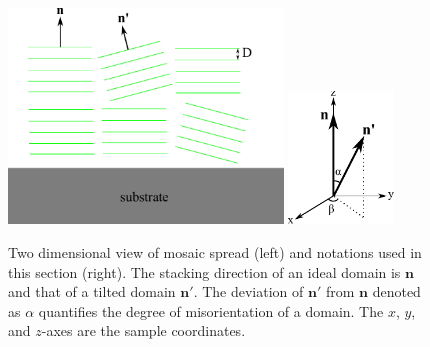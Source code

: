 \begin{figure}
  \centering
  \includegraphics[width=0.65\textwidth]{figures/ripple/mosaic/stack}
  \quad
  \includegraphics[width=0.25\textwidth]{figures/ripple/mosaic/spherical_coordinates}
  \caption{Two dimensional view of mosaic spread (left) and 
  notations used in this section (right). 
  The stacking direction of an ideal
  domain is $\mathbf{n}$ and that of a tilted domain $\mathbf{n'}$. 
  The deviation of $\mathbf{n'}$ from $\mathbf{n}$ denoted as $\alpha$
  quantifies the degree of misorientation of a domain. 
  The $x$, $y$, and $z$-axes are the sample coordinates.}
  \label{fig:spherical_coordinates}
\end{figure}

